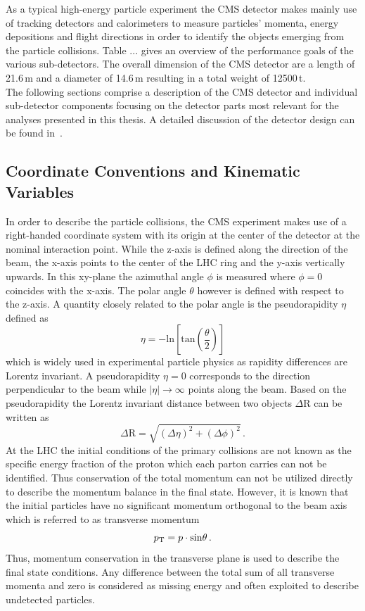 As a typical high-energy particle experiment the CMS detector makes mainly use of tracking detectors and calorimeters to measure particles' momenta, energy depositions and flight directions in order to identify the objects emerging from the particle collisions. Table ...  gives an overview of the performance goals of the various sub-detectors. The overall dimension of the CMS detector are a length of 21.6\,m and a diameter of 14.6\,m resulting in a total weight of 12500\,t. \\  
The following sections comprise a description of the CMS detector and individual sub-detector components focusing on the detector parts most relevant for the analyses presented in this thesis. A detailed discussion of the detector design can be found in~\cite{Chatrchyan:2008zzk, bib:cmsptdr1}.

\subsection{Coordinate Conventions and Kinematic Variables}
\label{subsec:cms_coordinates}
In order to describe the particle collisions, the CMS experiment makes use of a right-handed coordinate system with its origin at the center of the detector at the nominal interaction point. While the z-axis is defined along the direction of the beam, the x-axis points to the center of the LHC ring and the y-axis vertically upwards. In this xy-plane the azimuthal angle $\phi$ is measured where $\phi = 0$ coincides with the x-axis. The polar angle $\theta$ however is defined with respect to the z-axis. A quantity closely related to the polar angle is the pseudorapidity $\eta$ defined as
\begin{equation}
\eta = \mathrm{-ln} \left[\mathrm{tan} \left(\frac{\theta}{2} \right)\right]
\end{equation}
which is widely used in experimental particle physics as rapidity differences are Lorentz invariant. A pseudorapidity $\eta = 0$ corresponds to the direction perpendicular to the beam while $|\eta| \rightarrow \infty$ points along the beam. Based on the pseudorapidity the Lorentz invariant distance between two objects $\Delta$R can be written as
\begin{equation}
\Delta \mathrm{R} = \sqrt{(\Delta \eta)^2 + (\Delta \phi)^2} \, .
\end{equation}
At the LHC the initial conditions of the primary collisions are not known as the specific energy fraction of the proton which each parton carries can not be identified. Thus conservation of the total momentum can not be utilized directly to describe the momentum balance in the final state. However, it is known that the initial particles have no significant momentum orthogonal to the beam axis which is referred to as transverse momentum 
\begin{equation}
p_{\text{T}} = p \cdot \mathrm{sin}\theta \, .
\end{equation}
Thus, momentum conservation in the transverse plane is used to describe the final state conditions. Any difference between the total sum of all transverse momenta and zero is considered as missing energy \met and often exploited to describe undetected particles.

